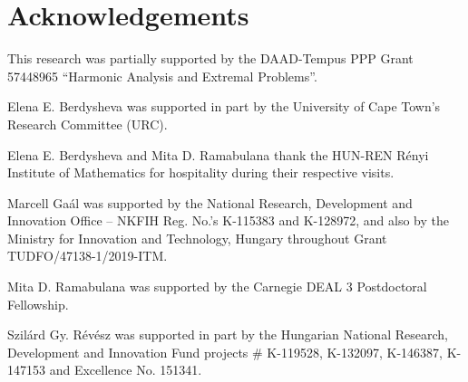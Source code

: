 \documentclass[[a4paper,english,12pt]{amsart}
\theoremstyle{plain}
\theoremstyle{remark}
\begin{document}
\section{Acknowledgements}

This research was partially supported by the DAAD-Tempus PPP Grant 57448965 ``Harmonic Analysis and Extremal Problems''.

Elena E. Berdysheva was supported  in part by the University of Cape Town's Research Committee (URC).

Elena E. Berdysheva and Mita D. Ramabulana thank the HUN-REN R\'enyi Institute of Mathematics for hospitality during their respective visits.

Marcell Ga\'al was supported by the National Research, Development and Innovation Office -- NKFIH Reg. No.'s K-115383 and K-128972, and also by the Ministry for Innovation and Technology, Hungary throughout Grant TUDFO/47138-1/2019-ITM.

Mita D. Ramabulana was supported by the Carnegie DEAL 3 Postdoctoral Fellowship.

Szil\'ard Gy. Révész was supported in part by the Hungarian National Research, Development and Innovation Fund projects \# K-119528, K-132097, K-146387, K-147153 and Excellence No.
151341.



\end{document}
